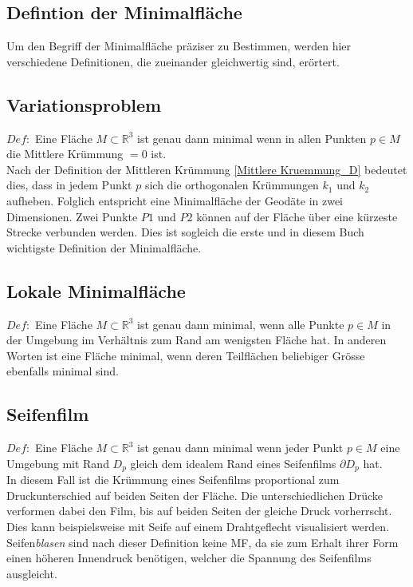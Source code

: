 \begin{refsection}
\section{Defintion der Minimalfläche}
Um den Begriff der Minimalfläche präziser zu Bestimmen, werden hier verschiedene Definitionen, die zueinander gleichwertig sind, erörtert.

\subsection{Variationsproblem}\label{Variationsproblem}
$Def:$ Eine Fläche $ \textit{M} \subset \mathbb{R}^{3} $ ist genau dann minimal wenn in allen Punkten $p \in M$ die Mittlere Krümmung $=0$ ist.\\
Nach der Definition der Mittleren Krümmung \eqref{Mittlere Kruemmung_D} bedeutet dies, dass in jedem Punkt $p$ sich die orthogonalen Krümmungen $k_1$ und $k_2$ aufheben.
Folglich entspricht eine Minimalfläche der Geodäte in zwei Dimensionen. Zwei Punkte $P1$ und $P2$ können auf der Fläche über eine kürzeste Strecke verbunden werden.  Dies ist sogleich die erste und in diesem Buch wichtigste Definition der Minimalfläche.

\subsection{Lokale Minimalfläche}\label{Lokale Minimalflaeche}

$Def:$ Eine Fläche $M\subset\mathbb{R}^{3}$ ist genau dann minimal, wenn alle Punkte $ p \in M $ in der Umgebung  im Verhältnis zum Rand am wenigsten Fläche hat.
In anderen Worten ist eine Fläche minimal, wenn deren Teilflächen beliebiger Grösse ebenfalls minimal sind.  

\subsection{Seifenfilm}\label{Seifenfilm}
$Def:$ Eine Fläche $M\subset\mathbb{R}^{3}$ ist genau dann minimal wenn jeder Punkt $p \in M$ eine Umgebung mit Rand $D_p$ gleich dem idealem Rand eines Seifenfilms $\partial D_p$ hat.\\
In diesem Fall ist die Krümmung eines Seifenfilms proportional zum Druckunterschied auf beiden Seiten der Fläche. Die unterschiedlichen Drücke verformen dabei den Film, bis auf beiden Seiten der gleiche Druck vorherrscht. Dies kann beispielsweise mit Seife auf einem Drahtgeflecht visualisiert werden. Seifen\textit{blasen} sind nach dieser Definition keine MF, da sie zum Erhalt ihrer Form einen höheren Innendruck benötigen, welcher die Spannung des Seifenfilms ausgleicht.






\printbibliography[heading=subbibliography]
\end{refsection}